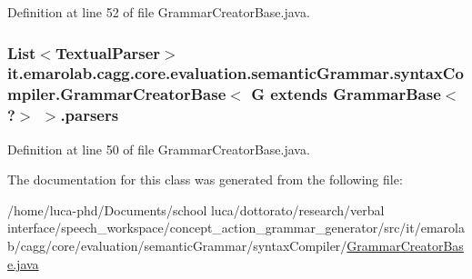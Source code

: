 Definition at line 52 of file Grammar\-Creator\-Base.\-java.

\hypertarget{classit_1_1emarolab_1_1cagg_1_1core_1_1evaluation_1_1semanticGrammar_1_1syntaxCompiler_1_1Gramma1bf252c3f4def91ad707660fdfe73d0a_a7590d69339977f1793a7d9444820705f}{
\subsubsection[{parsers}]{\setlength{\rightskip}{0pt plus 5cm}List$<${\bf Textual\-Parser}$>$ it.\-emarolab.\-cagg.\-core.\-evaluation.\-semantic\-Grammar.\-syntax\-Compiler.\-Grammar\-Creator\-Base$<$ G extends Grammar\-Base$<$ ?$>$ $>$.parsers\hspace{0.3cm}{\ttfamily [private]}}}\label{classit_1_1emarolab_1_1cagg_1_1core_1_1evaluation_1_1semanticGrammar_1_1syntaxCompiler_1_1Gramma1bf252c3f4def91ad707660fdfe73d0a_a7590d69339977f1793a7d9444820705f}


Definition at line 50 of file Grammar\-Creator\-Base.\-java.



The documentation for this class was generated from the following file\-:\begin{DoxyCompactItemize}
\item 
/home/luca-\/phd/\-Documents/school luca/dottorato/research/verbal interface/speech\-\_\-workspace/concept\-\_\-action\-\_\-grammar\-\_\-generator/src/it/emarolab/cagg/core/evaluation/semantic\-Grammar/syntax\-Compiler/\hyperlink{GrammarCreatorBase_8java}{Grammar\-Creator\-Base.\-java}\end{DoxyCompactItemize}
